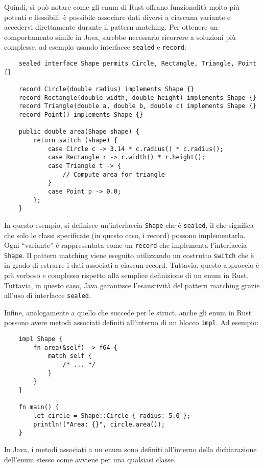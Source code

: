 Quindi, si può notare come gli enum di Rust offrano funzionalità molto più potenti e flessibili: è possibile associare dati diversi a ciascuna variante e accedervi direttamente durante il pattern matching. Per ottenere un comportamento simile in Java, sarebbe necessario ricorrere a soluzioni più complesse, ad esempio usando interfacce \texttt{sealed} e \texttt{record}:
\begin{verbatim}
    sealed interface Shape permits Circle, Rectangle, Triangle, Point {}

    record Circle(double radius) implements Shape {}
    record Rectangle(double width, double height) implements Shape {}
    record Triangle(double a, double b, double c) implements Shape {}
    record Point() implements Shape {}

    public double area(Shape shape) {
        return switch (shape) {
            case Circle c -> 3.14 * c.radius() * c.radius();
            case Rectangle r -> r.width() * r.height();
            case Triangle t -> {
                // Compute area for triangle
            }
            case Point p -> 0.0;
        };
    }
\end{verbatim}
In questo esempio, si definisce un'interfaccia \texttt{Shape} che è \texttt{sealed}, il che significa che solo le classi specificate (in questo caso, i record) possono implementarla. Ogni ``variante'' è rappresentata come un \texttt{record} che implementa l'interfaccia \texttt{Shape}. Il pattern matching viene eseguito utilizzando un costrutto \texttt{switch} che è in grado di estrarre i dati associati a ciascun record. Tuttavia, questo approccio è più verboso e complesso rispetto alla semplice definizione di un enum in Rust. Tuttavia, in questo caso, Java garantisce l'esaustività del pattern matching grazie all'uso di interfacce \texttt{sealed}.

Infine, analogamente a quello che succede per le struct, anche gli enum in Rust possono avere metodi associati definiti all'interno di un blocco \texttt{impl}. Ad esempio:
\begin{verbatim}
    impl Shape {
        fn area(&self) -> f64 {
            match self {
                /* ... */
            }
        }
    }

    fn main() {
        let circle = Shape::Circle { radius: 5.0 };
        println!("Area: {}", circle.area());
    }
\end{verbatim}
In Java, i metodi associati a un enum sono definiti all'interno della dichiarazione dell'enum stesso come avviene per una qualsiasi classe.